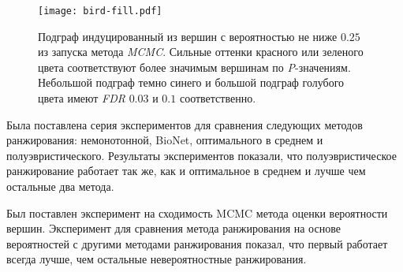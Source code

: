\begin{figure}
    \centering
    \texttt{[image: bird-fill.pdf]}
    \caption{
        Подграф индуцированный из вершин с вероятностью не ниже $0.25$ из
        запуска метода \emph{MCMC}.  Сильные оттенки красного или зеленого
        цвета соответствуют более значимым вершинам по \emph{P}-значениям.
        Небольшой подграф темно синего и большой подграф голубого цвета имеют
        \emph{FDR} $0.03$ и $0.1$ соответственно.
    }%
    \label{fig:bird-fill}%
\end{figure}





\chapterconclusion
Была поставлена серия экспериментов для сравнения следующих методов ранжирования:
немонотонной, BioNet, оптимального в среднем и полуэвристического.  Результаты
экспериментов показали, что полуэвристическое ранжирование работает так же, как
и оптимальное в среднем и лучше чем остальные два метода.

Был поставлен эксперимент на сходимость MCMC метода оценки вероятности вершин.
Эксперимент для сравнения метода ранжирования на основе вероятностей с другими
методами ранжирования показал, что первый работает всегда лучше, чем остальные
невероятностные ранжирования.
